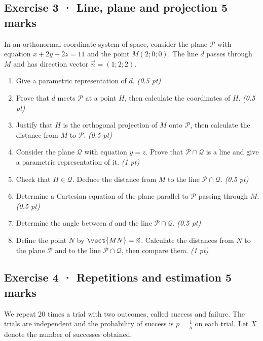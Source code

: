 \subsection*{Exercise 3 · Line, plane and projection \hfill 5 marks}In an orthonormal coordinate system of space, consider the plane $\mathcal P$ with equation $x+2y+2z=11$ and the point $M(2;0;0)$. The line $d$ passes through $M$ and has direction vector $\vec n=(1;2;2)$.

\begin{enumerate}

\item Give a parametric representation of $d$. \hfill\textit{(0.5 pt)}

\item Prove that $d$ meets $\mathcal P$ at a point $H$, then calculate the coordinates of $H$. \hfill\textit{(0.5 pt)}

\item Justify that $H$ is the orthogonal projection of $M$ onto $\mathcal P$, then calculate the distance from $M$ to $\mathcal P$. \hfill\textit{(0.5 pt)}

\item Consider the plane $\mathcal Q$ with equation $y=z$. Prove that $\mathcal P\cap\mathcal Q$ is a line and give a parametric representation of it. \hfill\textit{(1 pt)}

\item Check that $H\in\mathcal Q$. Deduce the distance from $M$ to the line $\mathcal P\cap\mathcal Q$. \hfill\textit{(0.5 pt)}

\item Determine a Cartesian equation of the plane parallel to $\mathcal P$ passing through $M$. \hfill\textit{(0.5 pt)}

\item Determine the angle between $d$ and the line $\mathcal P\cap\mathcal Q$. \hfill\textit{(0.5 pt)}

\item Define the point $N$ by $\vect{MN}=\vec n$. Calculate the distances from $N$ to the plane $\mathcal P$ and to the line $\mathcal P\cap\mathcal Q$, then compare them. \hfill\textit{(1 pt)}

\end{enumerate}

\subsection*{Exercise 4 · Repetitions and estimation \hfill 5 marks}We repeat $20$ times a trial with two outcomes, called success and failure. The trials are independent and the probability of success is $p=\frac{1}{5}$ on each trial. Let $X$ denote the number of successes obtained.

